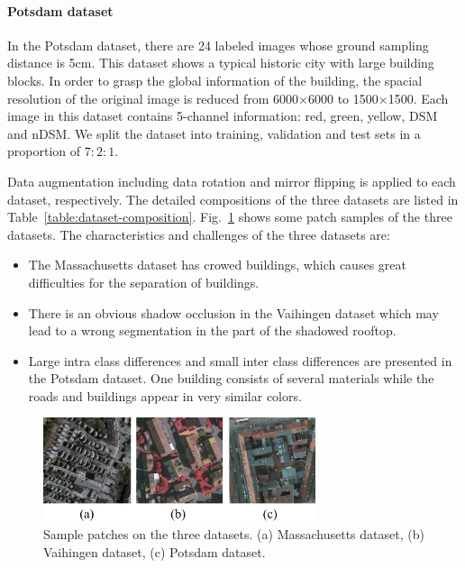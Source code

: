 \paragraph{Potsdam dataset}
%
In the Potsdam dataset, there are 24 labeled images whose ground sampling distance is 5cm.
This dataset shows a typical historic city with large building blocks. In order to grasp the global information of the building, the spacial resolution of the original image is reduced from 6000$\times$6000 to 1500$\times$1500.
Each image in this dataset contains 5-channel information: red, green, yellow, DSM and nDSM.
We split the dataset into training, validation and test sets in a proportion of $7:2:1$.



Data augmentation including data rotation and mirror flipping is applied to each dataset, respectively.
%
The detailed compositions of the three datasets are listed in Table~\ref{table:dataset-composition}.
Fig.~\ref{fig:dataset_sample} shows some patch samples of the three datasets.
The characteristics and challenges of the three datasets are:
\begin{itemize}
 \item The Massachusetts dataset has crowed buildings, which causes great difficulties for the separation of buildings.
 \item There is an obvious shadow occlusion in the Vaihingen dataset which may lead to a wrong segmentation in the part of the shadowed rooftop.
 \item Large intra class differences and small inter class differences are presented in the Potsdam dataset. One building consists of several materials while the roads and buildings appear in very similar colors. 
\end{itemize}


\begin{figure}
\centering
\includegraphics[width=8cm]{Figures/datasets.eps}
\caption{Sample patches on the three datasets. (a) Massachusetts dataset, (b) Vaihingen dataset, (c) Potsdam dataset.}
\label{fig:dataset_sample}
\end{figure}

